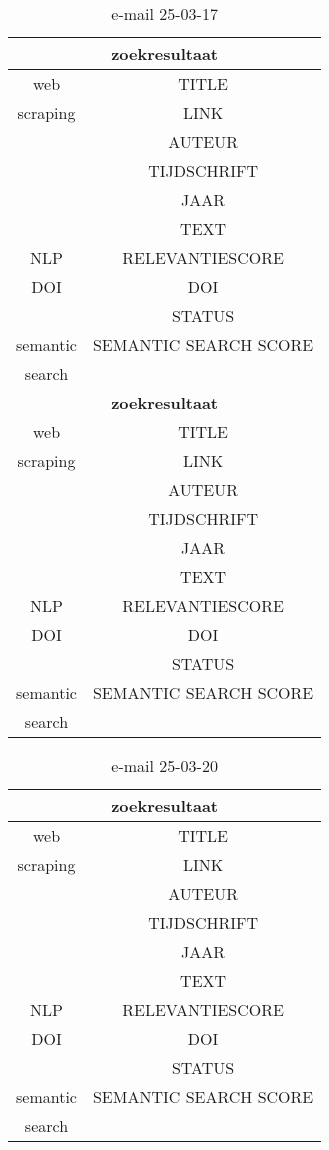 \begin{table}[h!]
    \caption{e-mail 25-03-17}
    \centering
    \begin{tabular}{|c|c|} 
        \hline
        \multicolumn{2}{|c|}{\textbf{zoekresultaat}} \\
        \hline
        web &TITLE\\
        scraping&LINK\\
        &AUTEUR\\
        &TIJDSCHRIFT\\
        &JAAR\\
        &TEXT\\
        \hline
        NLP&RELEVANTIESCORE\\
        \hline
        DOI&DOI\\
        &STATUS\\
        \hline
        semantic&SEMANTIC SEARCH SCORE\\
        search&\\
        \hline
        \multicolumn{2}{|c|}{\textbf{zoekresultaat}} \\
        \hline
        web &TITLE\\
        scraping&LINK\\
        &AUTEUR\\
        &TIJDSCHRIFT\\
        &JAAR\\
        &TEXT\\
        \hline
        NLP&RELEVANTIESCORE\\
        \hline
        DOI&DOI\\
        &STATUS\\
        \hline
        semantic&SEMANTIC SEARCH SCORE\\
        search&\\
        \hline
    \end{tabular}
    \label{table:email20250317}
\end{table}
\begin{table}[h!]
    \caption{e-mail 25-03-20}
    \centering
    \begin{tabular}{|c|c|} 
        \hline
        \multicolumn{2}{|c|}{\textbf{zoekresultaat}} \\
        \hline
        web &TITLE\\
        scraping&LINK\\
        &AUTEUR\\
        &TIJDSCHRIFT\\
        &JAAR\\
        &TEXT\\
        \hline
        NLP&RELEVANTIESCORE\\
        \hline
        DOI&DOI\\
        &STATUS\\
        \hline
        semantic&SEMANTIC SEARCH SCORE\\
        search&\\
        \hline
    \end{tabular}
    \label{table:email20250320}
\end{table}
